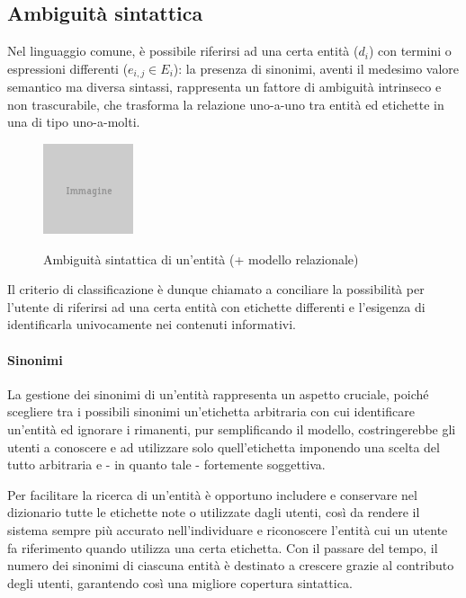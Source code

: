 \subsection{Ambiguità sintattica}
Nel linguaggio comune, è possibile riferirsi ad una certa entità ($d_i$) con termini o espressioni differenti ($e_{i,j} \in E_i$): la presenza di sinonimi, aventi il medesimo valore semantico ma diversa sintassi, rappresenta un fattore di ambiguità intrinseco e non trascurabile, che trasforma la relazione uno-a-uno tra entità ed etichette in una di tipo uno-a-molti.

\begin{figure}[ht]
	\begin{center}
		\includegraphics{placeholder.png}
		\label{fig:tesi:stage:fase-uno:ambiguita-sintattica}
		\caption{Ambiguità sintattica di un'entità (+ modello relazionale)}
	\end{center}
\end{figure}

Il criterio di classificazione è dunque chiamato a conciliare la possibilità per l'utente di riferirsi ad una certa entità con etichette differenti e l'esigenza di identificarla univocamente nei contenuti informativi.

\paragraph{Sinonimi}
La gestione dei sinonimi di un'entità rappresenta un aspetto cruciale, poiché scegliere tra i possibili sinonimi un'etichetta arbitraria con cui identificare un'entità ed ignorare i rimanenti, pur semplificando il modello, costringerebbe gli utenti a conoscere e ad utilizzare solo quell'etichetta imponendo una scelta del tutto arbitraria e - in quanto tale - fortemente soggettiva.

Per facilitare la ricerca di un'entità è opportuno includere e conservare nel dizionario tutte le etichette note o utilizzate dagli utenti, così da rendere il sistema sempre più accurato nell'individuare e riconoscere l'entità cui un utente fa riferimento quando utilizza una certa etichetta. Con il passare del tempo, il numero dei sinonimi di ciascuna entità è destinato a crescere grazie al contributo degli utenti, garantendo così una migliore copertura sintattica.

